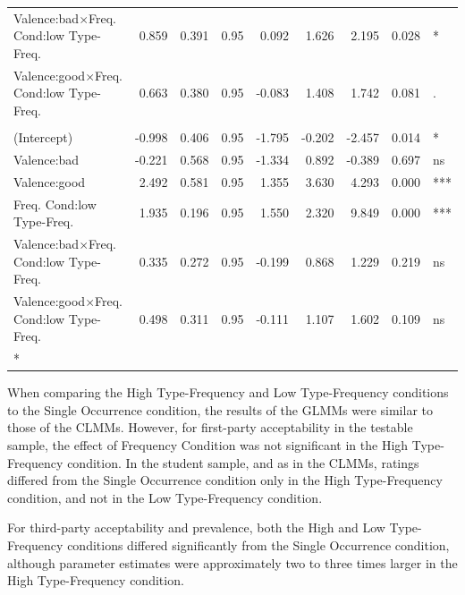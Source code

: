 \documentclass[
]{article}
\begin{document}
\begin{longtable}[t]{lrrrrrrrl}
Valence:bad$\times$Freq.
Cond:low
\hspace{1em}Type-Freq. & 0.859 & 0.391 & 0.95 & 0.092 & 1.626 & 2.195 & 0.028 & *\\
Valence:good$\times$Freq.
Cond:low
\hspace{1em}Type-Freq. & 0.663 & 0.380 & 0.95 & -0.083 & 1.408 & 1.742 & 0.081 & .\\
\addlinespace[0.3em]
\multicolumn{9}{l}{\textbf{Prevalence - Low Type-Frequency (vs. Single Occurrence) - Testable}}\\
\hspace{1em}(Intercept) & -0.998 & 0.406 & 0.95 & -1.795 & -0.202 & -2.457 & 0.014 & *\\
\hspace{1em}Valence:bad & -0.221 & 0.568 & 0.95 & -1.334 & 0.892 & -0.389 & 0.697 & ns\\
\hspace{1em}Valence:good & 2.492 & 0.581 & 0.95 & 1.355 & 3.630 & 4.293 & 0.000 & ***\\
Freq.
Cond:low
\hspace{1em}Type-Freq. & 1.935 & 0.196 & 0.95 & 1.550 & 2.320 & 9.849 & 0.000 & ***\\
Valence:bad$\times$Freq.
Cond:low
\hspace{1em}Type-Freq. & 0.335 & 0.272 & 0.95 & -0.199 & 0.868 & 1.229 & 0.219 & ns\\
Valence:good$\times$Freq.
Cond:low
\hspace{1em}Type-Freq. & 0.498 & 0.311 & 0.95 & -0.111 & 1.107 & 1.602 & 0.109 & ns\\*
\end{longtable}

When comparing the High Type-Frequency and Low Type-Frequency conditions to the Single Occurrence condition, the results of the GLMMs were similar to those of the CLMMs. However, for first-party acceptability in the testable sample, the effect of Frequency Condition was not significant in the High Type-Frequency condition. In the student sample, and as in the CLMMs, ratings differed from the Single Occurrence condition only in the High Type-Frequency condition, and not in the Low Type-Frequency condition.

For third-party acceptability and prevalence, both the High and Low Type-Frequency conditions differed significantly from the Single Occurrence condition, although parameter estimates were approximately two to three times larger in the High Type-Frequency condition.
\end{document}
